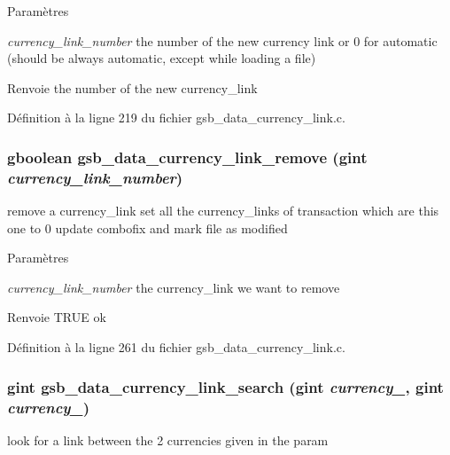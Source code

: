 \begin{DoxyParams}{Paramètres}
\item[{\em currency\_\-link\_\-number}]the number of the new currency link or 0 for automatic (should be always automatic, except while loading a file)\end{DoxyParams}
\begin{DoxyReturn}{Renvoie}
the number of the new currency\_\-link 
\end{DoxyReturn}


Définition à la ligne 219 du fichier gsb\_\-data\_\-currency\_\-link.c.

\subsubsection[{gsb\_\-data\_\-currency\_\-link\_\-remove}]{\setlength{\rightskip}{0pt plus 5cm}gboolean gsb\_\-data\_\-currency\_\-link\_\-remove (gint {\em currency\_\-link\_\-number})}\label{gsb__data__currency__link_8h_af6a6a897e207d9a9d1627640a96ade55}
remove a currency\_\-link set all the currency\_\-links of transaction which are this one to 0 update combofix and mark file as modified


\begin{DoxyParams}{Paramètres}
\item[{\em currency\_\-link\_\-number}]the currency\_\-link we want to remove\end{DoxyParams}
\begin{DoxyReturn}{Renvoie}
TRUE ok 
\end{DoxyReturn}


Définition à la ligne 261 du fichier gsb\_\-data\_\-currency\_\-link.c.

\subsubsection[{gsb\_\-data\_\-currency\_\-link\_\-search}]{\setlength{\rightskip}{0pt plus 5cm}gint gsb\_\-data\_\-currency\_\-link\_\-search (gint {\em currency\_}, \/  gint {\em currency\_})}\label{gsb__data__currency__link_8h_ae1bb872fddbad3052301ba8ef1b1e9bb}
look for a link between the 2 currencies given in the param


